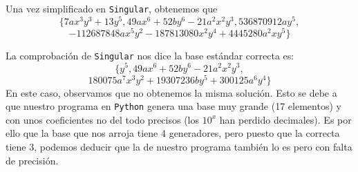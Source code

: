 \documentclass[10pt,a4paper]{article}
\begin{document}
\begin{enumerate}[label=(\alph*)]
\begin{itemize}
			Una vez simplificado en \texttt{Singular}, obtenemos que
			\[
				\{7ax^3y^3+13y^5,49ax^6+52by^6-21a^2x^2y^3, 536870912ay^5,
			\]
			\[
				-112687848ax^5y^2 - 187813080x^2y^4 + 4445280a^2xy^5\}
			\]
			
			La comprobación de \texttt{Singular} nos dice la base estándar correcta es:
			\[
				\{y^5, 49ax^6+52by^6-21a^2x^2y^3, 
			\]
			\[
				180075 a^7 x^3y^2 + 19307236 b y^5 + 300125a^6y^4 \}
			\]
			En este caso, observamos que no obtenemos la misma solución. Esto se debe a que nuestro programa en \texttt{Python} genera una base muy grande (17 elementos) y con unos coeficientes no del todo precisos (los \(10^x\) han perdido decimales). Es por ello que la base que nos arroja tiene 4 generadores, pero puesto que la correcta tiene 3, podemos deducir que la de nuestro programa también lo es pero con falta de precisión.
	\end{itemize}
\end{enumerate}
\end{document}
